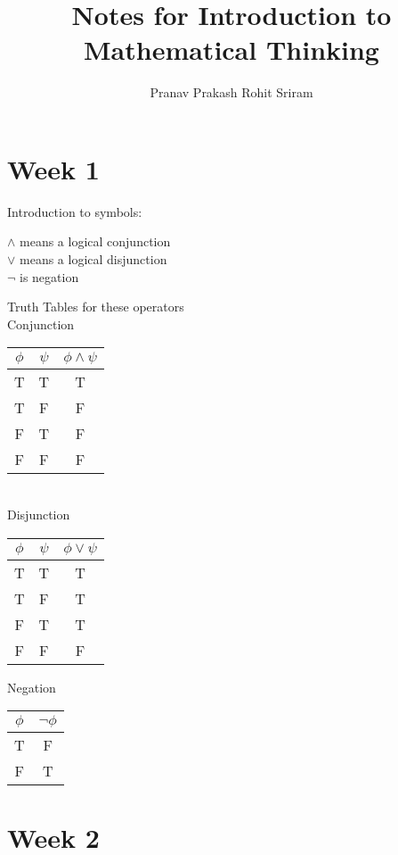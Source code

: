 \documentclass[]{article}
\begin{document}
\title{Notes for Introduction to Mathematical Thinking}
\author{Pranav Prakash \cr Rohit Sriram}
\maketitle

\section{Week 1}

Introduction to symbols:

\begin{center}

\begin{framed}
	$\wedge$ means a logical conjunction \\
 	$\vee$ means a logical disjunction \\
 	$\neg$ is negation
\end{framed}

Truth Tables for these operators \\
\bigskip
\bigskip
Conjunction \\
\bigskip

\begin{tabular}{c c | c}
$\phi$ & $\psi$ & $\phi \wedge \psi$ \\ \hline
T & T & T \\
T & F & F \\
F & T & F \\
F & F & F
\end{tabular} \\

\bigskip
\bigskip
Disjunction \\
\bigskip

\begin{tabular}{c c | c}
$\phi$ & $\psi$ & $\phi \vee \psi$ \\ \hline
T & T & T \\
T & F & T \\
F & T & T \\
F & F & F
\end{tabular}

\bigskip
\bigskip
Negation \\
\bigskip

\begin{tabular}{c | c}
$\phi$ & $\neg \phi$ \\ \hline
T & F \\
F & T
\end{tabular}


\end{center}

\section{Week 2}
\end{document}
